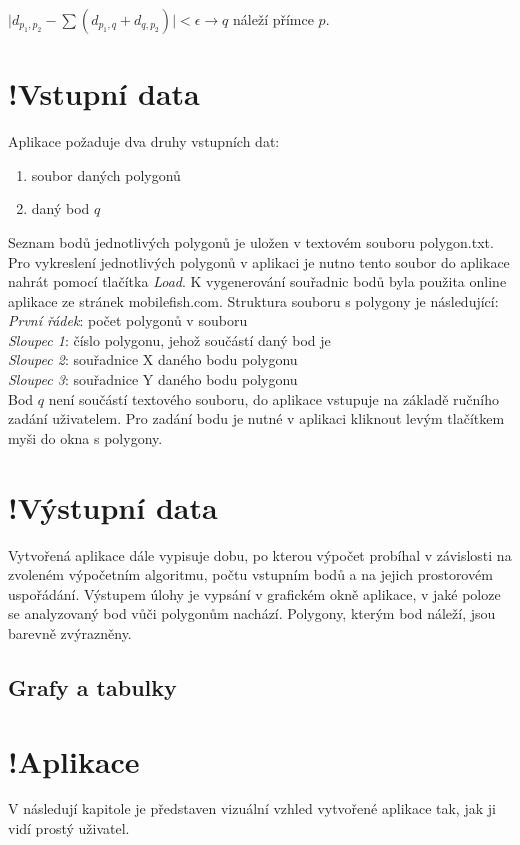 \documentclass[a4paper, 12pt]{article}
\begin{document}
$\mid d_{p_1,p_2} - \sum(d_{p_1,q} + d_{q,p_2}) \mid  < \epsilon \rightarrow q$ náleží přímce $p$.

\section{!Vstupní data}
Aplikace požaduje dva druhy vstupních dat:

\begin{enumerate}
\item soubor daných polygonů
\item daný bod $q$
\end{enumerate}

Seznam bodů jednotlivých polygonů je uložen v textovém souboru polygon.txt. Pro vykreslení jednotlivých polygonů v aplikaci je nutno tento soubor do aplikace nahrát pomocí tlačítka \textsl{Load}. K vygenerování souřadnic bodů byla použita online aplikace ze stránek mobilefish.com. Struktura souboru s polygony je následující:\\

\noindent
\textsl{První řádek}: počet polygonů v souboru\\
\textsl{Sloupec 1}: číslo polygonu, jehož součástí daný bod je\\
\textsl{Sloupec 2}: souřadnice X daného bodu polygonu\\
\textsl{Sloupec 3}: souřadnice Y daného bodu polygonu\\

Bod $q$ není součástí textového souboru, do aplikace vstupuje na základě ručního zadání uživatelem. Pro zadání bodu je nutné v aplikaci kliknout levým tlačítkem myši do okna s polygony.

\section{!Výstupní data}
Vytvořená aplikace dále vypisuje dobu, po kterou  výpočet probíhal v závislosti na zvoleném výpočetním algoritmu, počtu vstupním bodů a na jejich prostorovém uspořádání.
Výstupem úlohy je vypsání v grafickém okně aplikace, v jaké poloze se analyzovaný bod vůči polygonům nachází. Polygony, kterým bod náleží, jsou barevně zvýrazněny.

\subsection{Grafy a tabulky}

\clearpage
\section{!Aplikace}
V následují kapitole je představen vizuální vzhled vytvořené aplikace tak, jak ji vidí prostý uživatel.
\end{document}
